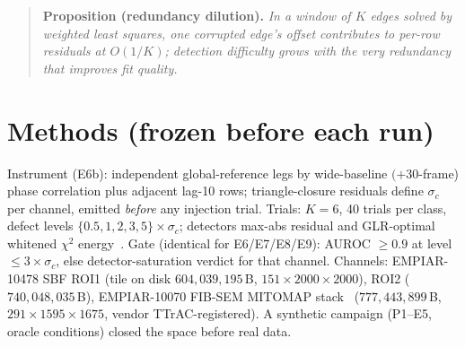 \documentclass[10pt]{article}
\begin{document}
\begin{quote}
\textbf{Proposition (redundancy dilution).} \emph{In a window of $K$ edges solved by weighted least squares, one corrupted edge's offset contributes to per-row residuals at $O(1/K)$; detection difficulty grows with the very redundancy that improves fit quality.}
\end{quote}

\section{Methods (frozen before each run)}
Instrument (E6b): independent global-reference legs by wide-baseline $(+30$-frame) phase correlation plus adjacent lag-10 rows; triangle-closure residuals define $\sigma_c$ per channel, emitted \emph{before} any injection trial. Trials: $K=6$, 40 trials per class, defect levels $\{0.5,1,2,3,5\}\times\sigma_c$; detectors max-abs residual and GLR-optimal whitened $\chi^2$ energy~\cite{baarda}. Gate (identical for E6/E7/E8/E9): AUROC $\geq 0.9$ at level $\leq 3\times\sigma_c$, else detector-saturation verdict for that channel. Channels: EMPIAR-10478 SBF ROI1 (tile on disk $604{,}039{,}195$\,B, $151{\times}2000{\times}2000$), ROI2 ($740{,}048{,}035$\,B), EMPIAR-10070 FIB-SEM MITOMAP stack~\cite{mitomap} ($777{,}443{,}899$\,B, $291{\times}1595{\times}1675$, vendor TTrAC-registered). A synthetic campaign (P1--E5, oracle conditions) closed the space before real data.
\end{document}
